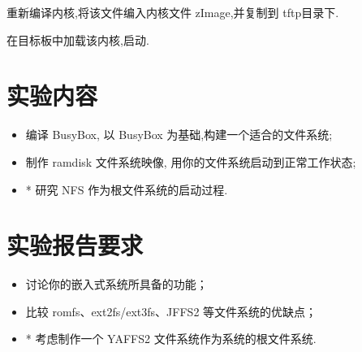 	重新编译内核,将该文件编入内核文件 zImage,并复制到 tftp目录下.

	在目标板中加载该内核,启动.

\section{实验内容}
\begin{itemize}\itemsep=-3pt
  \item 编译 BusyBox, 以 BusyBox 为基础,构建一个适合的文件系统;
  \item 制作 ramdisk 文件系统映像, 用你的文件系统启动到正常工作状态;
  \item * 研究 NFS 作为根文件系统的启动过程.
\end{itemize}

\section{实验报告要求}
\begin{itemize}\itemsep=-3pt
  \item 讨论你的嵌入式系统所具备的功能；
  \item 比较 romfs、ext2fs/ext3fs、JFFS2 等文件系统的优缺点；
  \item * 考虑制作一个 YAFFS2 文件系统作为系统的根文件系统.
\end{itemize}
